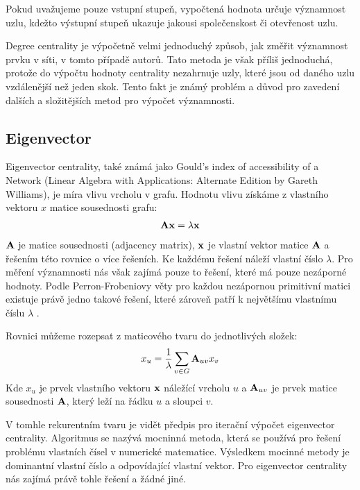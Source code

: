 \documentclass[12pt,titlepage]{report}
\begin{document}
Pokud uvažujeme pouze vstupní stupeň, vypočtená hodnota určuje významnost uzlu, kdežto výstupní stupeň ukazuje jakousi společenskost či otevřenost uzlu. 

Degree centrality je výpočetně velmi jednoduchý způsob, jak změřit významnost
prvku v síti, v tomto případě autorů. Tato metoda je však příliš jednoduchá,
protože do výpočtu hodnoty centrality nezahrnuje uzly, které jsou od daného
uzlu vzdálenější než jeden skok. Tento fakt je známý problém a důvod pro
zavedení dalších a složitějších metod pro výpočet významnosti.



\subsection{Eigenvector}
Eigenvector centrality, také známá jako Gould's index of accessibility of a
Network (Linear Algebra with Applications: Alternate Edition by Gareth
Williams), je míra vlivu vrcholu v grafu. Hodnotu vlivu získáme z vlastního
vektoru $x$ matice sousednosti grafu:
\begin{align}
{\bf Ax} &= \lambda {\bf x} \\
\end{align}
${\bf A}$ je matice sousednosti (adjacency matrix), ${\bf x}$ je vlastní vektor
matice ${\bf A}$ a řešením této rovnice o více řešeních. Ke každému řešení
náleží vlastní číslo $\lambda$. Pro měření významnosti nás však zajímá pouze to
řešení, které má pouze nezáporné hodnoty. Podle Perron-Frobeniovy věty pro
každou nezápornou primitivní matici existuje právě jedno takové řešení, které
zároveň patří k největšímu vlastnímu číslu $\lambda$ \cite{langvillemeyer}.

Rovnici můžeme rozepsat z maticového tvaru do jednotlivých složek:
\begin{align} x_u &=  \frac{1}{\lambda} \displaystyle\sum_{v \in G} {\bf
A}_{uv} x_v \\ \end{align} Kde $x_u$ je prvek vlastního vektoru ${\bf x}$
náležící vrcholu $u$ a ${\bf A}_{uv}$ je prvek matice sousednosti ${\bf A}$,
který leží na řádku $u$ a sloupci $v$.

V tomhle rekurentním tvaru je vidět předpis pro iterační výpočet eigenvector
centrality. Algoritmus se nazývá mocninná metoda, která se používá pro řešení
problému vlastních čísel v numerické matematice. Výsledkem mocinné metody je
dominantní vlastní číslo a odpovídající vlastní vektor. Pro eigenvector
centrality nás zajímá právě tohle řešení a žádné jiné.
\end{document}
